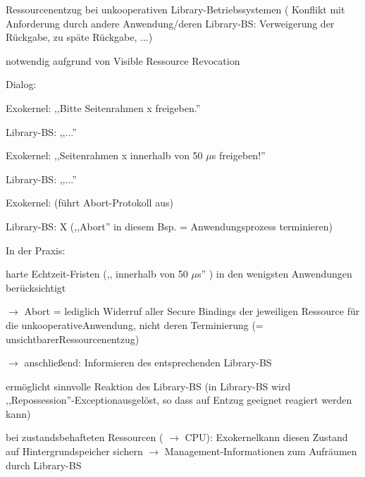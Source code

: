 \documentclass[a4paper]{article}
\begin{document}
\begin{multicols}{3}
    \begin{itemize*}
        \item
        Ressourcenentzug bei unkooperativen Library-Betriebssystemen (
        Konflikt mit Anforderung durch andere Anwendung/deren Library-BS:
        Verweigerung der Rückgabe, zu späte Rückgabe, ...)
        \item
        notwendig aufgrund von Visible Ressource Revocation
        \item
        Dialog:
        \begin{itemize*}
            \item Exokernel: ,,Bitte Seitenrahmen x freigeben.''
            \item Library-BS: ,,...''
            \item Exokernel: ,,Seitenrahmen x innerhalb von 50 $\mu$s freigeben!''
            \item Library-BS: ,,...''
            \item Exokernel: (führt Abort-Protokoll aus)
            \item Library-BS: X (,,Abort'' in diesem Bsp. = Anwendungsprozess terminieren)
        \end{itemize*}
        \item
        In der Praxis:
        \begin{itemize*}
            \item harte Echtzeit-Fristen (,, innerhalb von 50 $\mu$s'' ) in den wenigsten Anwendungen berücksichtigt \begin{itemize*} \item[$\rightarrow$] Abort = lediglich Widerruf aller Secure Bindings der jeweiligen Ressource für die unkooperativeAnwendung, nicht deren Terminierung (= unsichtbarerRessourcenentzug) \item[$\rightarrow$] anschließend: Informieren des entsprechenden Library-BS \end{itemize*}
            \item ermöglicht sinnvolle Reaktion des Library-BS (in Library-BS wird ,,Repossession''-Exceptionausgelöst, so dass auf Entzug geeignet reagiert werden kann)
            \item bei zustandsbehafteten Ressourcen ( $\rightarrow$ CPU): Exokernelkann diesen Zustand auf Hintergrundspeicher sichern $\rightarrow$ Management-Informationen zum Aufräumen durch Library-BS
        \end{itemize*}
    \end{itemize*}



\end{multicols}
\end{document}
